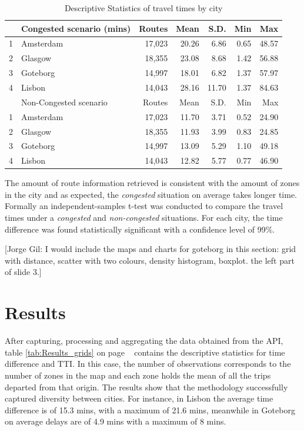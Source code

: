 \documentclass[a4paper]{jpconf}
\begin{document}
	\begin{table}[ht]		
		\centering
		\begin{tabular}{rlrrrrr}
			\hline
			& Congested scenario (mins) & Routes & Mean & S.D. & Min & Max 	   \\ 
			\hline
			1 & Amsterdam 	& 17,023 & 20.26 & 6.86 	& 0.65 & 48.57 		   \\ 
			2 & Glasgow 	& 18,355 & 23.08 & 8.68 	& 1.42 & 56.88 		   \\ 
			3 & Goteborg 	& 14,997 & 18.01 & 6.82 	& 1.37 & 57.97 	       \\ 
			4 & Lisbon 		& 14,043 & 28.16 & 11.70 	& 1.37 & 84.63 	       \\ 
			
			\hline
			& Non-Congested scenario & Routes & Mean & S.D. & Min & Max    \\ 
			\hline
			1 & Amsterdam	& 17,023 & 11.70 & 3.71 & 0.52 & 24.90 	       \\ 
			2 & Glasgow 	& 18,355 & 11.93 & 3.99 & 0.83 & 24.85 	       \\ 
			3 & Goteborg 	& 14,997 & 13.09 & 5.29 & 1.10 & 49.18 	       \\ 
			4 & Lisbon 		& 14,043 & 12.82 & 5.77 & 0.77 & 46.90         \\ 
			\hline
		\end{tabular}
		\caption {Descriptive Statistics of travel times by city}
		\label{tab:Results_routes}
	\end{table}
	
	The amount of route information retrieved is consistent with the amount of zones in the city and as expected, the \textit{congested} situation on average takes longer time. Formally an independent-samples t-test was conducted to compare the travel times under a \textit{congested} and \textit{non-congested} situations. For each city, the time difference was found statistically significant with a confidence level of 99\%.
	
	[Jorge Gil: I would include the maps and charts for goteborg in this section: grid with distance, scatter with two colours, density histogram, boxplot. the left part of slide 3.]
	
	
	\section{Results} %
	After capturing, processing and aggregating the data obtained from the API, table \ref{tab:Results_grids} on page ~\pageref{tab:Results_grids} contains the descriptive statistics for time difference and TTI. In this case, the number of observations corresponds to the number of zones in the map and each zone holds the mean of all the trips departed from that origin. 
	The results show that the methodology successfully captured diversity between cities. For instance, in Lisbon the average time difference is of 15.3 mins, with a maximum of 21.6 mins, meanwhile in Goteborg on average delays are of 4.9 mins with a maximum of 8 mins.  
	
\end{document}
